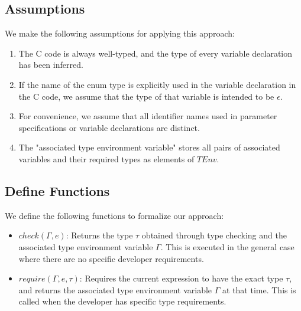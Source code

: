 \documentclass[10pt,conference]{IEEEtran}
\begin{document}
\subsection{Assumptions}
We make the following assumptions for applying this approach:

\begin{enumerate}
    \item The C code is always well-typed, and the type of every variable declaration has been inferred.
    \item If the name of the enum type is explicitly used in the variable declaration in the C code, we assume that the type of that variable is intended to be $\epsilon$.
    \item For convenience, we assume that all identifier names used in parameter specifications or variable declarations are distinct.
    \item The "associated type environment variable" stores all pairs of associated variables and their required types as elements of $TEnv$.
\end{enumerate}

\subsection{Define Functions}
We define the following functions to formalize our approach:

\newcommand{\checktype}[4]{\ensuremath{{check}(#1,\,#2)=(#3,\,#4)}}
\newcommand{\requiretype}[4]{\ensuremath{{require}(#1,\,#2,\,#3)=#4}}

\begin{itemize}
    \item $check(\Gamma,e)$: Returns the type $\tau$ obtained through type checking and the associated type environment variable $\Gamma$. This is executed in the general case where there are no specific developer requirements.
    \item $require(\Gamma,e,\tau)$: Requires the current expression to have the exact type $\tau$, and returns the associated type environment variable $\Gamma$ at that time. This is called when the developer has specific type requirements.
\end{itemize}
\end{document}
